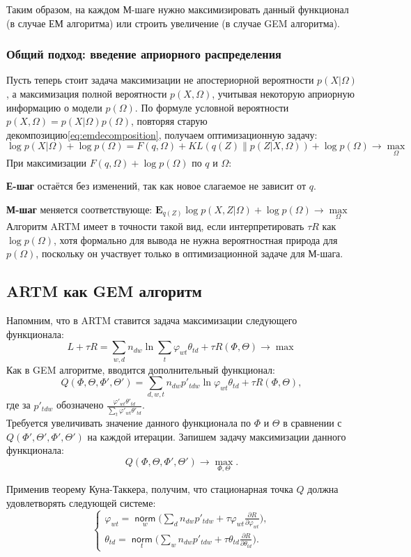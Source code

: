 \documentclass[12pt]{article}
\renewcommand{\phi}{\varphi}
\newcommand{\norm}{\mathop{\mathsf{norm}}\limits}
\begin{document}
Таким образом, на каждом М-шаге нужно максимизировать данный функционал (в случае ЕМ алгоритма) или строить увеличение (в случае GEM алгоритма).
\subsubsection{Общий подход: введение априорного распределения}
Пусть теперь стоит задача максимизации не апостериорной вероятности $p(X|\Omega)$, а максимизация полной вероятности $p(X, \Omega)$, учитывая некоторую априорную информацию о модели $p(\Omega)$. По формуле условной вероятности $p(X, \Omega) = p(X|\Omega) p(\Omega)$, повторяя старую декомпозицию\eqref{eq:emdecomposition}, получаем оптимизационную задачу:
\[
\log p(X|\Omega) + \log p(\Omega) = F(q, \Omega) + KL(q(Z)\|p(Z|X,\Omega)) + \log p(\Omega) \to \max\limits_{\Omega}
\]
При максимизации $ F(q, \Omega) + \log p(\Omega)$ по $q$ и $\Omega$:

\textbf{Е-шаг} остаётся без изменений, так как новое слагаемое не зависит от $q$.

\textbf{М-шаг} меняется соответствующе: $\mathbf{E}_{q(Z)} \log p(X, Z|\Omega) + \log p(\Omega)\to \max\limits_{\Omega}$\\
Алгоритм ARTM имеет в точности такой вид, если интерпретировать $\tau R$ как $\log p(\Omega)$, хотя формально для вывода не нужна вероятностная природа для $p(\Omega)$, поскольку он участвует только в оптимизационной задаче для М-шага.
	\subsection{ARTM как GEM алгоритм}
\label{subsec:artmasgem}

Напомним, что в ARTM ставится задача максимизации следующего функционала:
\[
L + \tau R = \sum_{w,d} n_{dw} \ln\sum_t \phi_{wt} \theta_{td} + \tau R(\Phi, \Theta) \to \max
\]
Как в  GEM алгоритме, вводится дополнительный функционал:
\[
	Q(\Phi, \Theta, \Phi', \Theta') = \sum\limits_{d, w, t} n_{dw} p'_{tdw} \ln{\phi_{wt}\theta_{td}} + \tau R(\Phi, \Theta),
\]
где за $p'_{tdw}$ обозначено $\frac{\phi'_{wt} \theta'_{td}}{\sum\limits_t \phi'_{wt} \theta'_{td}}$.\\

Требуется увеличивать значение данного функционала по $\Phi$ и $\Theta$ в сравнении с $Q(\Phi', \Theta', \Phi', \Theta')$ на каждой итерации. Запишем задачу максимизации данного функционала:
\[
Q(\Phi, \Theta, \Phi', \Theta') \to \max_{\Phi, \Theta}.
\]

Применив теорему Куна-Таккера,  получим, что стационарная точка $Q$ должна удовлетворять следующей системе:
\[
\left\{
	\begin{aligned}
		\phi_{wt}= \norm_w \bigg( \sum\limits_d n_{dw} p'_{tdw} + \tau\phi_{wt} \frac{\partial{R}}{\partial{\phi_{wt}}} \bigg),\\
		\theta_{td} = \norm_t \bigg( \sum\limits_w n_{dw} p'_{tdw} + \tau\theta_{td} \frac{\partial{R}}{\partial{\theta_{td}}} \bigg).
	\end{aligned}
\right.
\]
\end{document}
